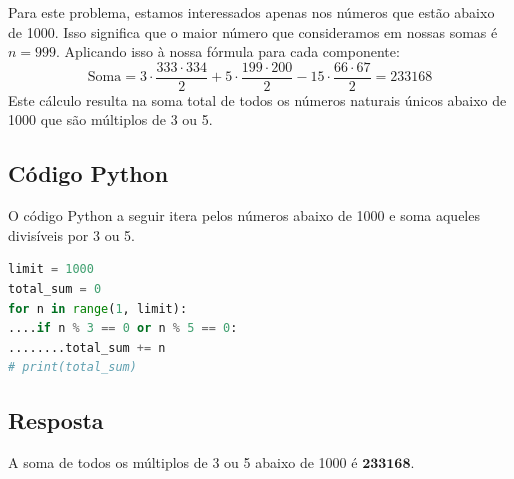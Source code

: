 Para este problema, estamos interessados apenas nos números que estão abaixo de 1000. Isso significa que o maior número que consideramos em nossas somas é $n=999$. Aplicando isso à nossa fórmula para cada componente:
\[
\text{Soma} = 3 \cdot \frac{333 \cdot 334}{2} + 5 \cdot \frac{199 \cdot 200}{2} - 15 \cdot \frac{66 \cdot 67}{2} = \boxed{233168}
\]
Este cálculo resulta na soma total de todos os números naturais únicos abaixo de 1000 que são múltiplos de 3 ou 5.



\subsection*{Código Python}
O código Python a seguir itera pelos números abaixo de 1000 e soma aqueles divisíveis por 3 ou 5.
\begin{lstlisting}[caption=Solução do Problema 1 em Python, language=Python]
limit = 1000
total_sum = 0
for n in range(1, limit):
....if n % 3 == 0 or n % 5 == 0:
........total_sum += n
# print(total_sum)
\end{lstlisting}



\subsection*{Resposta}
A soma de todos os múltiplos de 3 ou 5 abaixo de 1000 é $\mathbf{233168}$.

\newpage
